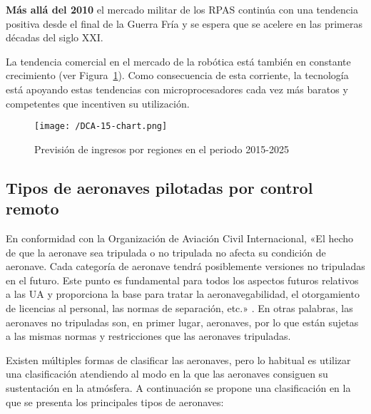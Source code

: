 \textbf{Más allá del 2010} el mercado militar de los \acs{RPAS} continúa con una tendencia positiva desde el final de la Guerra Fría y se espera que se acelere en las primeras décadas del siglo XXI.

La tendencia comercial en el mercado de la robótica está también en constante crecimiento (ver Figura~\ref{fig:prevision}). Como consecuencia de esta corriente, la tecnología está apoyando estas tendencias con microprocesadores cada vez más baratos y competentes que incentiven su utilización.

\begin{figure}[!h]
\begin{center}
\texttt{[image: /DCA-15-chart.png]}
\caption[Previsión de ingresos por regiones en el periodo 2015-2025]{Previsión de ingresos por regiones en el periodo 2015-2025 \cite{cuotamercado}}
\label{fig:prevision}
\end{center}
\end{figure}

\subsection{Tipos de aeronaves pilotadas por control remoto}
\label{sec:tipos}

En conformidad con la Organización de Aviación Civil Internacional, «El hecho de que la aeronave sea tripulada o no tripulada no afecta su condición de aeronave. Cada categoría de aeronave tendrá posiblemente versiones no tripuladas en el futuro.
Este punto es fundamental para todos los aspectos futuros relativos a las \acs{UA} y proporciona la base para tratar la aeronavegabilidad, el otorgamiento de licencias al personal, las normas de separación, etc.» \cite{OACI}. En otras palabras, las aeronaves no tripuladas son, en primer lugar, aeronaves, por lo que están sujetas a las mismas normas y restricciones que las aeronaves tripuladas.

Existen múltiples formas de clasificar las aeronaves, pero lo habitual es utilizar una clasificación atendiendo al modo en la que las aeronaves consiguen su sustentación en la atmósfera. A continuación se propone una clasificación en la que se presenta los principales tipos de aeronaves:  

